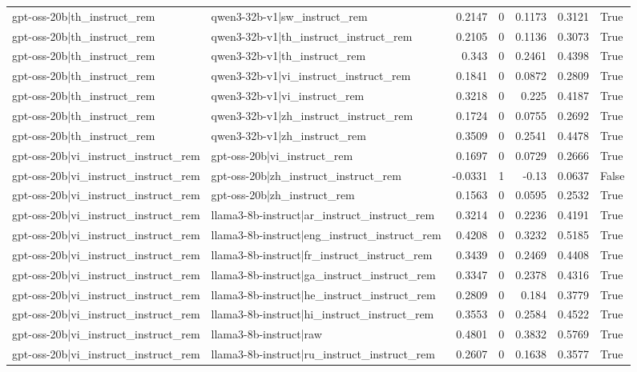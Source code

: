 \begin{table}
\begin{tabular}{l l r r r r l}
gpt-oss-20b|th_instruct_rem & qwen3-32b-v1|sw_instruct_rem & 0.2147 & 0 & 0.1173 & 0.3121 & True \\
gpt-oss-20b|th_instruct_rem & qwen3-32b-v1|th_instruct_instruct_rem & 0.2105 & 0 & 0.1136 & 0.3073 & True \\
gpt-oss-20b|th_instruct_rem & qwen3-32b-v1|th_instruct_rem & 0.343 & 0 & 0.2461 & 0.4398 & True \\
gpt-oss-20b|th_instruct_rem & qwen3-32b-v1|vi_instruct_instruct_rem & 0.1841 & 0 & 0.0872 & 0.2809 & True \\
gpt-oss-20b|th_instruct_rem & qwen3-32b-v1|vi_instruct_rem & 0.3218 & 0 & 0.225 & 0.4187 & True \\
gpt-oss-20b|th_instruct_rem & qwen3-32b-v1|zh_instruct_instruct_rem & 0.1724 & 0 & 0.0755 & 0.2692 & True \\
gpt-oss-20b|th_instruct_rem & qwen3-32b-v1|zh_instruct_rem & 0.3509 & 0 & 0.2541 & 0.4478 & True \\
gpt-oss-20b|vi_instruct_instruct_rem & gpt-oss-20b|vi_instruct_rem & 0.1697 & 0 & 0.0729 & 0.2666 & True \\
gpt-oss-20b|vi_instruct_instruct_rem & gpt-oss-20b|zh_instruct_instruct_rem & -0.0331 & 1 & -0.13 & 0.0637 & False \\
gpt-oss-20b|vi_instruct_instruct_rem & gpt-oss-20b|zh_instruct_rem & 0.1563 & 0 & 0.0595 & 0.2532 & True \\
gpt-oss-20b|vi_instruct_instruct_rem & llama3-8b-instruct|ar_instruct_instruct_rem & 0.3214 & 0 & 0.2236 & 0.4191 & True \\
gpt-oss-20b|vi_instruct_instruct_rem & llama3-8b-instruct|eng_instruct_instruct_rem & 0.4208 & 0 & 0.3232 & 0.5185 & True \\
gpt-oss-20b|vi_instruct_instruct_rem & llama3-8b-instruct|fr_instruct_instruct_rem & 0.3439 & 0 & 0.2469 & 0.4408 & True \\
gpt-oss-20b|vi_instruct_instruct_rem & llama3-8b-instruct|ga_instruct_instruct_rem & 0.3347 & 0 & 0.2378 & 0.4316 & True \\
gpt-oss-20b|vi_instruct_instruct_rem & llama3-8b-instruct|he_instruct_instruct_rem & 0.2809 & 0 & 0.184 & 0.3779 & True \\
gpt-oss-20b|vi_instruct_instruct_rem & llama3-8b-instruct|hi_instruct_instruct_rem & 0.3553 & 0 & 0.2584 & 0.4522 & True \\
gpt-oss-20b|vi_instruct_instruct_rem & llama3-8b-instruct|raw & 0.4801 & 0 & 0.3832 & 0.5769 & True \\
gpt-oss-20b|vi_instruct_instruct_rem & llama3-8b-instruct|ru_instruct_instruct_rem & 0.2607 & 0 & 0.1638 & 0.3577 & True \\

\end{tabular}
\end{table}
